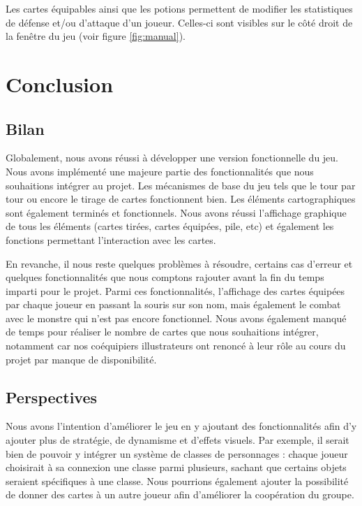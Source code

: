 \documentclass[12pt]{report}
\begin{document}
		Les cartes équipables ainsi que les potions permettent de modifier les statistiques de défense et/ou d'attaque d'un joueur. Celles-ci sont visibles sur le côté droit de la fenêtre du jeu (voir figure \ref{fig:manual}).

\chapter*{Conclusion}

  \section*{Bilan}
  Globalement, nous avons réussi à développer une version fonctionnelle du jeu. Nous avons implémenté une majeure partie des fonctionnalités que nous souhaitions intégrer au projet. Les mécanismes de base du jeu tels que le tour par tour ou encore le tirage de cartes fonctionnent bien. Les éléments cartographiques sont également terminés et fonctionnels. Nous avons réussi l'affichage graphique de tous les éléments (cartes tirées, cartes équipées, pile, etc) et également les fonctions permettant l'interaction avec les cartes.

  En revanche, il nous reste quelques problèmes à résoudre, certains cas d'erreur et quelques fonctionnalités que nous comptons rajouter avant la fin du temps imparti pour le projet. Parmi ces fonctionnalités, l'affichage des cartes équipées par chaque joueur en passant la souris sur son nom, mais également le combat avec le monstre qui n'est pas encore fonctionnel. Nous avons également manqué de temps pour réaliser le nombre de cartes que nous souhaitions intégrer, notamment car nos coéquipiers illustrateurs ont renoncé à leur rôle au cours du projet par manque de disponibilité.

  \section*{Perspectives}
	Nous avons l'intention d'améliorer le jeu en y ajoutant des fonctionnalités afin d'y ajouter plus de stratégie, de dynamisme et d'effets visuels. Par exemple, il serait bien de pouvoir y intégrer un système de classes de personnages : chaque joueur choisirait à sa connexion une classe parmi plusieurs, sachant que certains objets seraient spécifiques à une classe. Nous pourrions également ajouter la possibilité de donner des cartes à un autre joueur afin d'améliorer la coopération du groupe.
\end{document}
